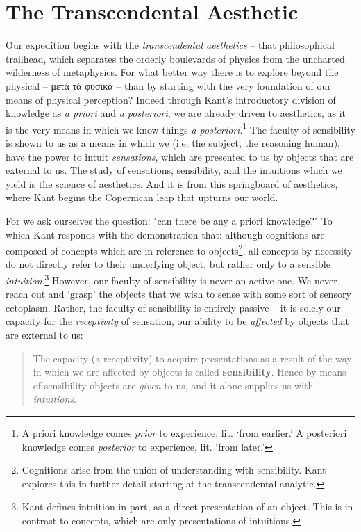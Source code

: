 \section*{The Transcendental Aesthetic}
Our expedition begins with the \emph{transcendental aesthetics} -- that philosophical trailhead, which separates the orderly boulevards of physics from the uncharted wilderness of metaphysics. For what better way there is to explore beyond the physical -- μετὰ τὰ φυσικά -- than by starting with the very foundation of our means of physical perception? Indeed through Kant's introductory division of knowledge as \emph{a priori} and \emph{a posteriori}, we are already driven to aesthetics, as it is the very means in which we know things \emph{a posteriori}.\footnote{A priori knowledge comes \emph{prior} to experience, lit. `from earlier.' A posteriori knowledge comes \emph{posterior} to experience, lit. `from later.'} The faculty of sensibility is shown to us as a means in which we (i.e. the subject, the reasoning human), have the power to intuit \emph{sensations}, which are presented to us by objects that are external to us. The study of sensations, sensibility, and the intuitions which we yield is the science of aesthetics. And it is from this springboard of aesthetics, where Kant begins the Copernican leap that upturns our world.

For we ask ourselves the question: "can there be any a priori knowledge?" To which Kant responds with the demonstration that: although cognitions are composed of concepts which are in reference to objects\footnote{Cognitions arise from the union of understanding with sensibility. Kant explores this in further detail starting at the transcendental analytic.}, all concepts by necessity do not directly refer to their underlying object, but rather only to a sensible \emph{intuition}.\footnote{Kant defines intuition in part, as a direct presentation of an object. This is in contrast to concepts, which are only presentations of intuitions.} However, our faculty of sensibility is never an active one. We never reach out and `grasp' the objects that we wish to sense with some sort of sensory ectoplasm. Rather, the faculty of sensibility is entirely passive -- it is solely our capacity for the \emph{receptivity} of sensation, our ability to be \emph{affected} by objects that are external to us:

\begin{quote}
The capacity (a receptivity) to acquire presentations as a result of the way in which we are affected by objects is called \textbf{sensibility}. Hence by means of sensibility objects are \emph{given} to us, and it alone supplies us with \emph{intuitions}.

\autocite[B33]{hackett}
\end{quote}

